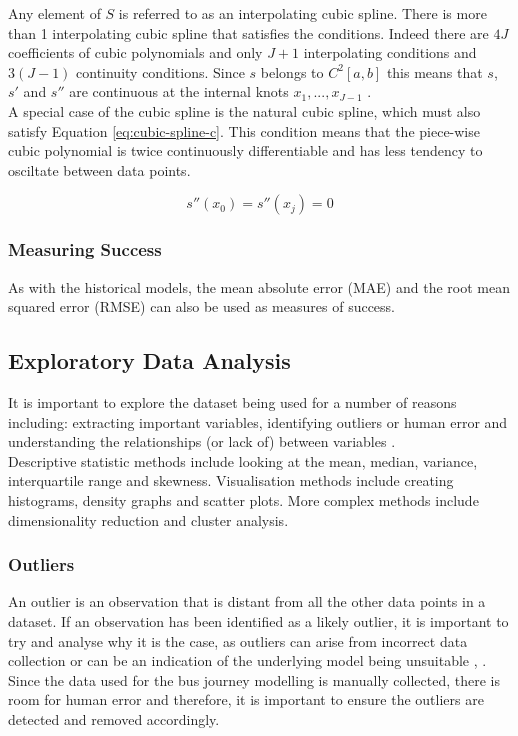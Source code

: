 Any element of $S$ is referred to as an interpolating cubic spline. There is more than 1 interpolating cubic spline that satisfies the conditions. Indeed there are $4J$  coefficients of cubic polynomials and only $J+1$ interpolating conditions and $3(J-1)$ continuity conditions. Since $s$ belongs to $C^2[a, b]$ this means that $s$, $s'$ and $s''$ are continuous at the internal knots $x_1, ..., x_{J-1}$ \cite{intro-to-numerical-analysis-suli}. \\

A special case of the cubic spline is the natural cubic spline, which must also satisfy Equation \ref{eq:cubic-spline-c}. This condition means that the piece-wise cubic polynomial is twice continuously differentiable and has less tendency to osciltate between data points.

\begin{equation}
    \label{eq:cubic-spline-c}
     s''(x_0) = s''(x_j) = 0
\end{equation}

\subsubsection{Measuring Success}

As with the historical models, the mean absolute error (MAE) and the root mean squared error (RMSE) can also be used as measures of success.

\subsection{Exploratory Data Analysis}

It is important to explore the dataset being used for a number of reasons including: extracting important variables, identifying outliers or human error and understanding the relationships (or lack of) between variables \cite{significance-of-eda}. \\

Descriptive statistic methods include looking at the mean, median, variance, interquartile range and skewness. Visualisation methods include creating histograms, density graphs and scatter plots. More complex methods include dimensionality reduction and cluster analysis. 

\subsubsection{Outliers}

An outlier is an observation that is distant from all the other data points in a dataset. If an observation has been identified as a likely outlier, it is important to try and analyse why it is the case, as outliers can arise from incorrect data collection or can be an indication of the underlying model being unsuitable \cite{forecasting-book}, \cite{m2s2-notes}. Since the data used for the bus journey modelling is manually collected, there is room for human error and therefore, it is important to ensure the outliers are detected and removed accordingly. \\

